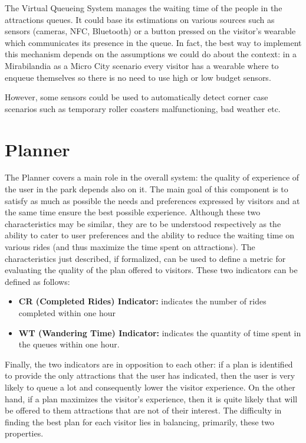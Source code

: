 The Virtual Queueing System manages the waiting time of the people in the attractions queues. It could base its estimations on various sources such
as sensors (cameras, NFC, Bluetooth) or a button pressed on the visitor's wearable which communicates its presence in the queue. In fact, the best
way to implement this mechanism depends on the assumptions we could do about the context: in a Mirabilandia as a Micro City scenario every visitor
has a wearable where to enqueue themselves so there is no need to use high or low budget sensors.

However, some sensors could be used to automatically detect corner case scenarios such as temporary roller coasters malfunctioning, bad weather etc.

\section{Planner}

The Planner covers a main role in the overall system: the quality of experience of the user in the park depends also on it. The main goal of this
component is to satisfy as much as possible the needs and preferences expressed by visitors and at the same time ensure the best possible experience.
Although these two characteristics may be similar, they are to be understood respectively as the ability to cater to user preferences and the ability
to reduce the waiting time on various rides (and thus maximize the time spent on attractions). The characteristics just described, if formalized, can
be used to define a metric for evaluating the quality of the plan offered to visitors. These two indicators can be defined as follows:

\begin{itemize}
	\item \textbf{CR (Completed Rides) Indicator:} indicates the number of rides completed within one hour
	\item \textbf{WT (Wandering Time) Indicator:} indicates the quantity of time spent in the queues within one hour.
\end{itemize}


Finally, the two indicators are in opposition to each other: if a plan is identified to provide the only attractions that the user has indicated,
then the user is very likely to queue a lot and consequently lower the visitor experience. On the other hand, if a plan maximizes the visitor's
experience, then it is quite likely that will be offered to them attractions that are not of their interest. The difficulty in finding the best plan
for each visitor lies in balancing, primarily, these two properties.

